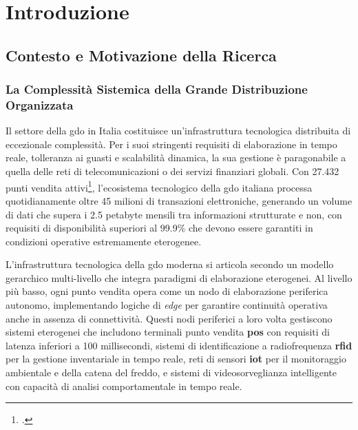 \chapter{\texorpdfstring{\textbf{Introduzione}}{Capitolo 1 - Introduzione}}
\label{cap:introduzione}

\section{\texorpdfstring{\textbf{Contesto e Motivazione della Ricerca}}{1.1 - Contesto e Motivazione della Ricerca}}
\label{sec:contesto_motivazione}

\subsection{\texorpdfstring{\textbf{La Complessità Sistemica della Grande Distribuzione Organizzata}}{1.1.1 - La Complessità Sistemica della Grande Distribuzione Organizzata}}

Il settore della \gls{gdo} in Italia costituisce un'infrastruttura tecnologica distribuita di eccezionale complessità. Per i suoi stringenti requisiti di elaborazione in tempo reale, tolleranza ai guasti e scalabilità dinamica, la sua gestione è paragonabile a quella delle reti di telecomunicazioni o dei servizi finanziari globali.
Con 27.432 punti vendita attivi\footcite{istat2024}, l'ecosistema tecnologico della \gls{gdo} italiana processa quotidianamente oltre 45 milioni di transazioni elettroniche, generando un volume di dati che supera i 2.5 petabyte mensili tra informazioni strutturate e non, con requisiti di disponibilità superiori al 99.9\% che devono essere garantiti in condizioni operative estremamente eterogenee.

L'infrastruttura tecnologica della \gls{gdo} moderna si articola secondo un modello gerarchico multi-livello che integra paradigmi di elaborazione eterogenei. 
Al livello più basso, ogni punto vendita opera come un nodo di elaborazione periferica autonomo, implementando logiche di \textit{\gls{edge}} per garantire continuità operativa anche in assenza di connettività. Questi nodi periferici a loro volta gestiscono sistemi eterogenei che includono terminali punto vendita \textbf{\gls{pos}} con requisiti di latenza inferiori a 100 millisecondi, sistemi di identificazione a radiofrequenza \textbf{\gls{rfid}} per la gestione inventariale in tempo reale, reti di sensori \textbf{\gls{iot}} per il monitoraggio ambientale e della catena del freddo, e sistemi di videosorveglianza intelligente con capacità di analisi comportamentale in tempo reale.

